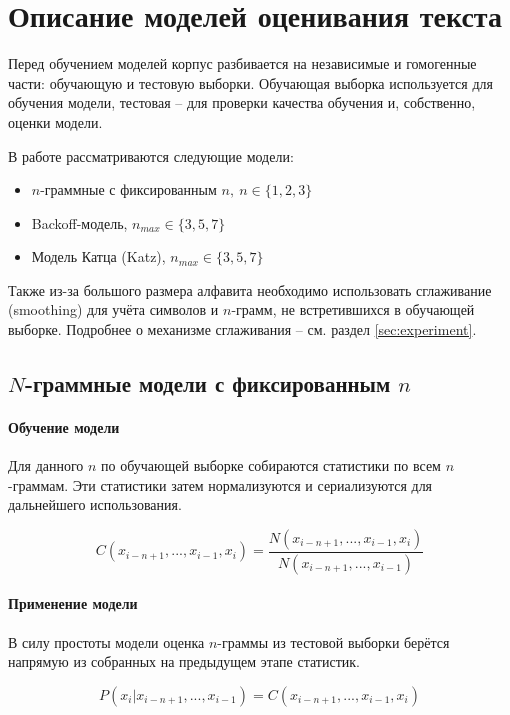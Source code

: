 \section{ Описание моделей оценивания текста }\label{sec:models}

Перед обучением моделей корпус разбивается на независимые и гомогенные части: обучающую и тестовую выборки. Обучающая выборка используется для обучения модели, тестовая -- для проверки качества обучения и, собственно, оценки модели.

В работе рассматриваются следующие модели: 

\begin{itemize}
	\item $n$-граммные с фиксированным $n,\ n \in \{1,2,3\}$
	
	\item Backoff-модель, $n_{max} \in \{ 3, 5, 7 \}$
	
	\item Модель Катца (Katz),  $n_{max} \in \{ 3, 5, 7 \}$
\end{itemize}

Также из-за большого размера алфавита необходимо использовать сглаживание (smoothing) для учёта символов и $n$-грамм, не встретившихся в обучающей выборке. Подробнее о механизме сглаживания -- см. раздел \ref{sec:experiment}.

\subsection{ $N$-граммные модели с фиксированным $n$ }

\paragraph{ Обучение модели } Для данного $n$ по обучающей выборке собираются статистики по всем $n$-граммам. Эти статистики затем нормализуются и сериализуются для дальнейшего использования.

$$ C(x_{i - n + 1}, ..., x_{i - 1}, x_i) = \dfrac{N(x_{i - n + 1}, ..., x_{i - 1}, x_i)}{N(x_{i - n + 1}, ..., x_{i - 1})} $$ 

\paragraph{ Применение модели } В силу простоты модели оценка $n$-граммы из тестовой выборки берётся напрямую из собранных на предыдущем этапе статистик.

$$ P(x_i | x_{i - n + 1}, ..., x_{i - 1}) = C(x_{i - n + 1}, ..., x_{i - 1}, x_i) $$

